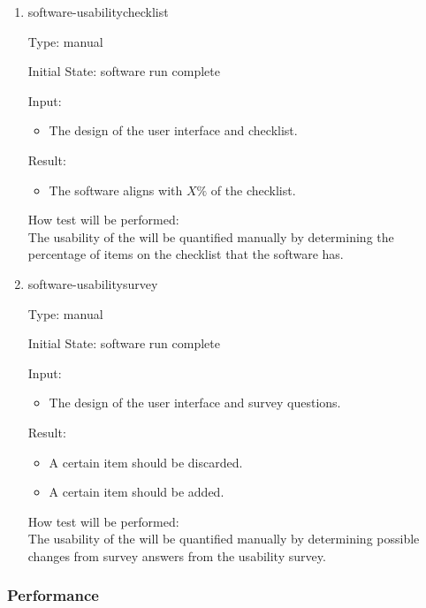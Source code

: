 \documentclass[12pt, titlepage]{article}
\begin{document}
\begin{enumerate}

\item{software-usabilitychecklist\\}

Type: manual
					
Initial State: \progname{} software run complete
					
Input:
\begin{itemize} %
\item The design of the user interface and checklist.
\end{itemize}

Result: 
\begin{itemize}
\item The software aligns with $X\%$ of the checklist.
\end{itemize}
				
					
How test will be performed: \\
The usability of the \progname{} will be quantified manually by determining 
the percentage of items on the checklist that the software has.\\

\item{software-usabilitysurvey\\}

Type: manual
					
Initial State: \progname{} software run complete
					
Input:
\begin{itemize} %
\item The design of the user interface and survey questions.
\end{itemize}

Result: 
\begin{itemize}
\item A certain item should be discarded.
\item A certain item should be added.
\end{itemize}
				
					
How test will be performed: \\
The usability of the \progname{} will be quantified manually by determining 
possible changes from survey answers from the usability survey.\\

\end{enumerate}

\subsubsection{Performance}
\end{document}
